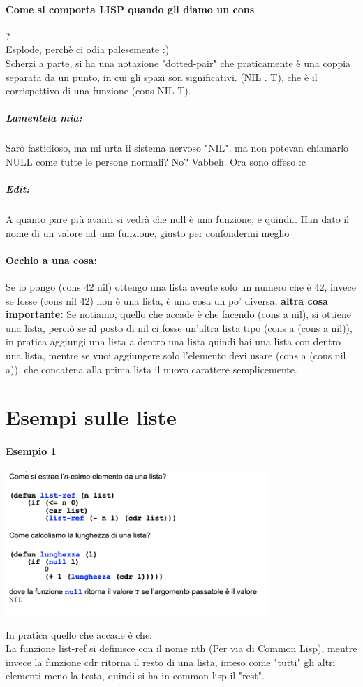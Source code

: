 \documentclass[12pt, a4paper, openany, oneside]{book}
\begin{document}
\paragraph{Come si comporta LISP quando gli diamo un cons}?\\
Esplode, perchè ci odia palesemente :)\\
Scherzi a parte, si ha una notazione "dotted-pair" che praticamente è una coppia
separata da un punto, in cui gli spazi son significativi. (NIL . T), che è il 
corrispettivo di una funzione (cons NIL T).
\subparagraph{Lamentela mia:} Sarò fastidioso, ma mi urta il sistema nervoso 
"NIL", ma non potevan chiamarlo NULL come tutte le persone normali? No? Vabbeh.
Ora sono offeso :c
\subparagraph{Edit: }A quanto pare più avanti si vedrà che null è una funzione,
e quindi.. Han dato il nome di un valore ad una funzione, giusto per confondermi
meglio	
\paragraph{Occhio a una cosa:} Se io pongo (cons 42 nil) ottengo una lista avente
solo un numero che è 42, invece se fosse (cons nil 42) non è una lista, è una 
cosa un po' diversa, \textbf{altra cosa importante: }Se notiamo, quello che 
accade è che facendo (cons a nil), si ottiene una lista, perciò se al posto di 
nil ci fosse un'altra lista tipo (cons a (cons a nil)), in pratica aggiungi una
lista a dentro una lista quindi hai una lista con dentro una lista, mentre 
se vuoi aggiungere solo l'elemento devi usare (cons a (cons nil a)), che 
concatena alla prima lista il nuovo carattere semplicemente. 
\section{Esempi sulle liste}
\paragraph{Esempio 1}
\begin{center}
\includegraphics[width=0.75\textwidth]{18}
\end{center}
In pratica quello che accade è che: \\
La funzione list-ref si definisce con il nome nth (Per via di Common Lisp),
mentre invece la funzione cdr ritorna il resto di una lista, inteso come "tutti"
gli altri elementi meno la testa, quindi si ha in common lisp il "rest".
\end{document}
